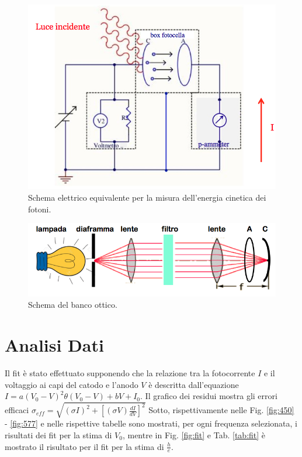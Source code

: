 \documentclass[10pt,a4paper]{article}
\begin{document}
\begin{figure}[h]
\begin{center}
\includegraphics[width=0.5\linewidth]{immagini/circuito_equivalente.png}
\caption{\small Schema elettrico equivalente per la misura dell'energia cinetica dei fotoni. }
\label{fig:cireq}
\end{center}
\end{figure}

\begin{figure}[h]
\begin{center}
\includegraphics[width=0.5\linewidth]{immagini/schema_banco.png}
\caption{\small Schema del banco ottico. }
\label{fig:schemabanco}
\end{center}
\end{figure}

\newpage
\section*{Analisi Dati}
Il fit è stato effettuato supponendo che la relazione tra la fotocorrente $I$ e il voltaggio ai capi del catodo e l'anodo $V$ è descritta dall'equazione $I=a(V_0-V)^2\theta(V_0-V)+bV+I_0$.\newline
Il grafico dei residui mostra gli errori efficaci $\sigma_{eff}=\sqrt{(\sigma I)^2+[(\sigma V) \frac{dI}{dV}]^2}$
Sotto, rispettivamente nelle Fig. \ref{fig:450} - \ref{fig:577} e nelle rispettive tabelle sono mostrati, per ogni frequenza selezionata, i risultati dei fit per la stima di $V_{0}$, mentre in Fig. \ref{fig:fit} e Tab. \ref{tab:fit} è mostrato il risultato per il fit per la stima di $\frac{h}{e}$.    \newline \newline
\end{document}
